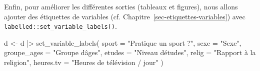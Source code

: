 \documentclass[
  letterpaper,
  DIV=11,
  numbers=noendperiod,
  oneside]{scrreprt}
\newenvironment{Shaded}{\begin{snugshade}}{\end{snugshade}}
\newcommand{\AttributeTok}[1]{\textcolor[rgb]{0.40,0.45,0.13}{#1}}
\newcommand{\FunctionTok}[1]{\textcolor[rgb]{0.28,0.35,0.67}{#1}}
\newcommand{\NormalTok}[1]{\textcolor[rgb]{0.00,0.23,0.31}{#1}}
\newcommand{\OtherTok}[1]{\textcolor[rgb]{0.00,0.23,0.31}{#1}}
\newcommand{\SpecialCharTok}[1]{\textcolor[rgb]{0.37,0.37,0.37}{#1}}
\newcommand{\StringTok}[1]{\textcolor[rgb]{0.13,0.47,0.30}{#1}}
\begin{document}
\begin{Shaded}
\end{Shaded}

Enfin, pour améliorer les différentes sorties (tableaux et figures),
nous allons ajouter des étiquettes de variables (cf.
Chapitre~\ref{sec-etiquettes-variables}) avec
\texttt{labelled::set\_variable\_labels()}.

\begin{Shaded}
\begin{Highlighting}[]
\NormalTok{d }\OtherTok{\textless{}{-}}\NormalTok{ d }\SpecialCharTok{|\textgreater{}} 
  \FunctionTok{set\_variable\_labels}\NormalTok{(}
    \AttributeTok{sport =} \StringTok{"Pratique un sport ?"}\NormalTok{,}
    \AttributeTok{sexe =} \StringTok{"Sexe"}\NormalTok{,}
    \AttributeTok{groupe\_ages =} \StringTok{"Groupe d\textquotesingle{}âges"}\NormalTok{,}
    \AttributeTok{etudes =} \StringTok{"Niveau d\textquotesingle{}études"}\NormalTok{,}
    \AttributeTok{relig =} \StringTok{"Rapport à la religion"}\NormalTok{,}
    \AttributeTok{heures.tv =} \StringTok{"Heures de télévision / jour"}
\NormalTok{  )}
\end{Highlighting}
\end{Shaded}
\end{document}
